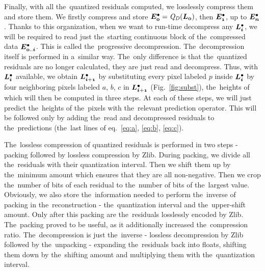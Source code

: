  Finally, with all the~quantized residuals computed, we losslessly compress them and store them. We firstly compress and store $\objdot{E}{0} = \opnorm{Q}{D}(\lnorm{0})$, then $\objdot{E}{1}$, up to $\objdot{E}{n}$. Thanks to this organization, when we want to run-time decompress any $\ldot{i}$, we will be required to read just the~starting continuous block of the~compressed data $\objdot{E}{0..i}$. This is called the~progressive decompression. The~decompression itself is performed in a~similar way. The~only difference is that the~quantized residuals are no longer calculated, they are just read and decompress. Thus, with $\ldot{i}$ available, we obtain $\ldot{i+1}$ by substituting every pixel labeled $p$ inside $\ldot{i}$ by four neighboring pixels labeled $a$, $b$, $c$ in $\ldot{i+1}$ (Fig.~\ref{fig:subst}), the~heights of which will then be computed in three steps. At each of these steps, we will just predict the~heights of the~pixels with the~relevant prediction operator. This will be followed only by adding the~read and decompressed residuals  to the~predictions (the~last lines of eq.~\ref{eq:a}, \ref{eq:b}, \ref{eq:c}).
 
  The~lossless compression of quantized residuals is performed in two steps - packing followed by lossless compression by Zlib. During packing, we divide all the~residuals with their quantization interval. Then we shift them up by the~minimum amount which ensures that they are all non-negative. Then we crop the~number of bits of each residual to the~number of bits of the~largest value. Obviously, we also store the~information needed to perform the~inverse of packing in the~reconstruction - the~quantization interval and the~upper-shift amount. Only after this packing are the~residuals losslessly encoded by Zlib. The~packing proved to be useful, as it additionally increased the~compression ratio. The~decompression is just the~inverse - lossless decompression by Zlib followed by the~unpacking - expanding the~residuals back into floats, shifting them down by the~shifting amount and multiplying them with the~quantization interval.
